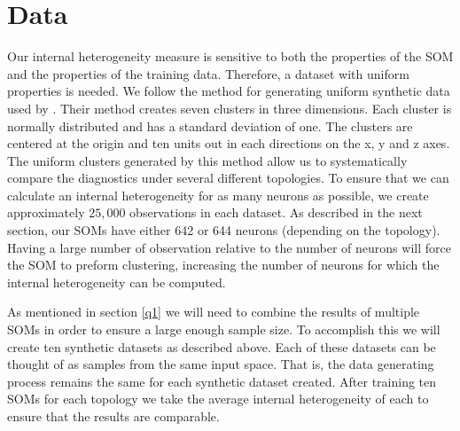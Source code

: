 \section{Data}
\label{meth:data}
Our internal heterogeneity measure is sensitive to both the properties of the SOM
and the properties of the training data. Therefore, a dataset with uniform
properties is needed. We follow the method for generating uniform synthetic
data used by \cite{wu2006}.  Their method creates seven clusters in three
dimensions.  Each cluster is normally distributed and has a standard deviation
of one.  The clusters are centered at the origin and ten units out in each
directions on the x, y and z axes. The uniform clusters generated by this method allow us to
systematically compare the diagnostics under several different topologies.  To
ensure that we can calculate an internal heterogeneity for as many neurons as
possible, we create approximately $25,000$ observations in each dataset.  As
described in the next section, our SOMs have either 642 or 644 neurons
(depending on the topology).  Having a large number of observation relative to
the number of neurons will force the SOM to preform clustering, increasing the
number of neurons for which the internal heterogeneity can be computed.

As mentioned in section \ref{q1} we will need to combine the results of
multiple SOMs in order to ensure a large enough sample size.  To accomplish
this we will create ten synthetic datasets as described above.  Each of these
datasets can be thought of as samples from the same input space.  That is, the
data generating process remains the same for each synthetic dataset created.
After training ten SOMs for each topology we take the average internal
heterogeneity of each to ensure that the results are comparable.





